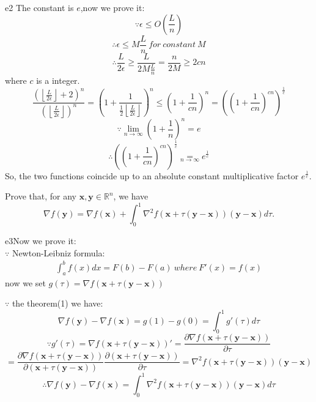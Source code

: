 \documentclass{article}
\begin{document}
\begin{PROOF}{e2}
The constant is $e$,now we prove it:\\
\[\because \epsilon \leq O(\frac{L}{n})\]
\[\therefore \epsilon \leq M\frac{L}{n} \ for\ constant\ M\]
\[\therefore \frac{L}{2\epsilon} \ge \frac{L}{2M\frac{L}{n}} = \frac{n}{2M} \ge 2cn\]
where $c$ is a integer.\\
\[
	\frac{ \left( \left\lfloor \frac{L}{2 \epsilon}\right\rfloor+2\right)^{n}}{\left(\left\lfloor\frac{L}{2 \epsilon}\right\rfloor\right)^{n}}=\left(1+\frac{1}{\frac{1}{2}\left\lfloor\frac{L}{2 \epsilon}\right\rfloor}\right)^{n} \leq\left(1+\frac{1}{c n}\right)^{n}=\left(\left(1+\frac{1}{c n}\right)^{c n}\right)^{\frac{1}{c}} 
\]
\[
	\because \lim _{n \rightarrow \infty}\left(1+\frac{1}{n}\right)^{n}=e
\]
\[
	\therefore \left(\left(1+\frac{1}{c n}\right)^{c n}\right)^{\frac{1}{c}} \underset{n \rightarrow \infty}{=}e^{\frac{1}{c}}
\]
So, the two functions coincide up to an absolute constant multiplicative factor $e^{\frac{1}{c}}$.
\end{PROOF}
\newcommand{\RBB}{\mathbb{R}}
\newcommand{\xB}{\mathbf{x}}
\newcommand{\yB}{\mathbf{y}}
\begin{excercise}\label{e3}
Prove that, for any $\xB, \yB \in \RBB^n$, we have
\[
	\nabla f(\yB) = \nabla f(\xB) + \int_{0}^{1} \nabla^2 f (\xB + \tau (\yB - \xB)) (\yB - \xB) d\tau.
\]
\end{excercise}
\begin{PROOF}{e3}Now we prove it:\\
$\because$ Newton-Leibniz formula:
\begin{align}
	\int_{a}^{b} f(x) dx= F(b) - F(a) \ where\ F'(x) = f(x)
\end{align}
now we set $g(\tau) = \nabla f(\xB + \tau(\yB - \xB))$

$\because$  the theorem(1) we have:
\[
	\nabla f(\yB) - \nabla f(\xB) = g(1) - g(0) = \int_{0}^{1} g'(\tau) d\tau
\]
\[
	\because g'(\tau) = \nabla f(\xB + \tau(\yB - \xB))' = \frac{\partial \nabla f(\xB + \tau(\yB - \xB))}{\partial \tau}
\]
\[
	= \frac{\partial \nabla f(\xB + \tau(\yB - \xB))}{\partial (\xB + \tau(\yB - \xB))}\frac{\partial (\xB + \tau(\yB - \xB))}{\partial \tau} = \nabla^2 f(\xB + \tau(\yB - \xB))(\yB - \xB)
\]
\[
	\therefore \nabla f(\yB) - \nabla f(\xB) = \int_{0}^{1} \nabla^2 f(\xB + \tau(\yB - \xB))(\yB - \xB) d\tau
\]

\end{PROOF}
\end{document}
